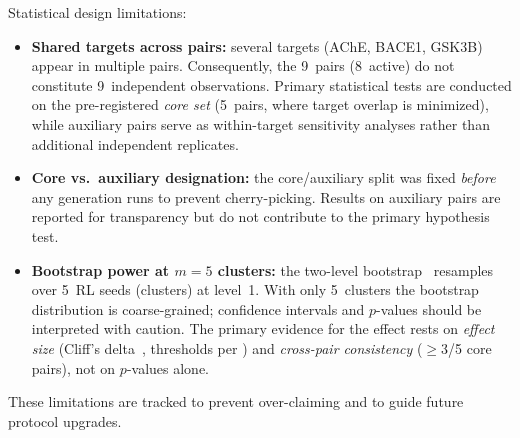 Statistical design limitations:
\begin{itemize}
\item \textbf{Shared targets across pairs:} several targets (AChE, BACE1, GSK3B)
appear in multiple pairs.  Consequently, the 9~pairs (8~active) do not constitute
9~independent observations.  Primary statistical tests are conducted on the
pre-registered \emph{core set} (5~pairs, where target overlap is minimized),
while auxiliary pairs serve as within-target sensitivity analyses rather than
additional independent replicates.
\item \textbf{Core vs.\ auxiliary designation:} the core/auxiliary split was
fixed \emph{before} any generation runs to prevent cherry-picking.  Results on
auxiliary pairs are reported for transparency but do not contribute to the
primary hypothesis test.
\item \textbf{Bootstrap power at $m=5$ clusters:} the two-level
bootstrap~\citep{cameron2008bootstrap, efron1993bootstrap} resamples over
5~RL seeds (clusters) at level~1.  With only 5~clusters the bootstrap
distribution is coarse-grained; confidence intervals and $p$-values should be
interpreted with caution.  The primary evidence for the effect rests on
\emph{effect size} (Cliff's delta~\citep{cliff1993dominance}, thresholds
per \citet{romano2006ordinal}) and \emph{cross-pair consistency}
($\geq$3/5 core pairs), not on $p$-values alone.
\end{itemize}

These limitations are tracked to prevent over-claiming and to guide future protocol upgrades.
